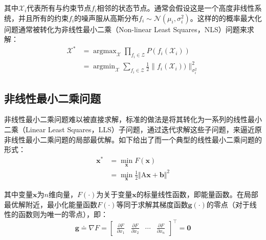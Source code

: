 其中$\mathcal{X}_i$代表所有与约束节点$f_i$相邻的状态节点。通常会假设这是一个高度非线性系统，并且所有的约束$f_i$的噪声服从高斯分布$f_i\sim\mathcal{N}(\mu_i, \sigma_i^2)$。这样的的概率最大化问题通常被转化为非线性最小二乘（Non-linear Least Squares，NLS）问题来求解：
\begin{equation}
\begin{aligned}
    \mathcal{X}^\ast &= \mathop{\arg\max}_{\mathcal{X}}
                        \prod_{f_i\in\mathcal{Z}} P(f_i(\mathcal{X}_i)) \\
                     &= \mathop{\arg\min}_{\mathcal{X}}
                        \sum_{f_i\in\mathcal{Z}} \frac{1}{2}
                        \lVert f_i(\mathcal{X}_i)) \rVert_{\sigma_i^2}^2
\end{aligned}
\end{equation}

\subsection{非线性最小二乘问题}

非线性最小二乘问题难以被直接求解，标准的做法是将其转化为一系列的线性最小二乘（Linear Least Squares，LLS）子问题，通过迭代求解这些子问题，来逼近原非线性最小二乘问题的局部最优解。如下给出了而一个典型的线性最小二乘问题的形式：
\begin{equation}
\begin{aligned}
    \bm{x}^\ast &= \mathop{\min}_{\bm{x}} F(\bm{x}) \\
                &= \mathop{\min}_{\bm{x}}
                   \frac{1}{2} \Vert \mathrm{A}\bm{x} + \bm{b} \Vert^2
\end{aligned}\label{eq:lls}
\end{equation}

其中变量$\bm{x}$为$n$维向量，$F(\cdot)$为关于变量$\bm{x}$的标量线性函数，即能量函数。在局部最优解附近，最小化能量函数$F(\cdot)$等同于求解其梯度函数$\bm{g}(\cdot)$的零点（对于线性的函数则为唯一的零点），即：
\begin{equation}
    \bm{g} \doteq \nabla F = \begin{bmatrix}
        \frac{\partial F}{\partial x_1} &
        \frac{\partial F}{\partial x_2} &
        \cdots &
        \frac{\partial F}{\partial x_n}
    \end{bmatrix}^\top = \bm{0}
\end{equation}

